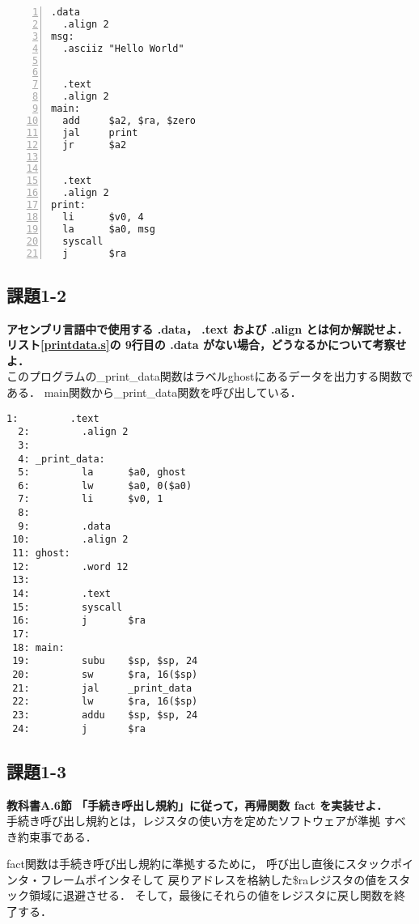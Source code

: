\documentclass[11pt]{jarticle}
\begin{document}
\begin{lstlisting}[caption=syscall命令を使う方法,label=syscall命令を使う方法,numbers=left]
  .data
  .align 2
msg:
  .asciiz "Hello World"


  .text
  .align 2
main:
  add     $a2, $ra, $zero
  jal     print
  jr      $a2

  
  .text
  .align 2
print:
  li      $v0, 4
  la      $a0, msg
  syscall
  j       $ra
\end{lstlisting}

\subsection{課題1-2}

\textbf{アセンブリ言語中で使用する .data， .text および .align とは何か解説せよ． リスト\ref{printdata.s}の 9行目の .data がない場合，どうなるかについて考察せよ．}\\

このプログラムの\_print\_data関数はラベルghostにあるデータを出力する関数である．
main関数から\_print\_data関数を呼び出している．

\begin{lstlisting}[caption=printdata.s,label=printdata.s]
  1:         .text
  2:         .align 2
  3: 
  4: _print_data:
  5:         la      $a0, ghost
  6:         lw      $a0, 0($a0)
  7:         li      $v0, 1
  8: 
  9:         .data
 10:         .align 2
 11: ghost:
 12:         .word 12
 13: 
 14:         .text
 15:         syscall
 16:         j       $ra
 17: 
 18: main:
 19:         subu    $sp, $sp, 24
 20:         sw      $ra, 16($sp)
 21:         jal     _print_data
 22:         lw      $ra, 16($sp)
 23:         addu    $sp, $sp, 24
 24:         j       $ra
\end{lstlisting}

\subsection{課題1-3}

\textbf{教科書A.6節 「手続き呼出し規約」に従って，再帰関数 fact を実装せよ．}\\

手続き呼び出し規約とは，レジスタの使い方を定めたソフトウェアが準拠
すべき約束事である．

fact関数は手続き呼び出し規約に準拠するために，
呼び出し直後にスタックポインタ・フレームポインタそして
戻りアドレスを格納した\$raレジスタの値をスタック領域に退避させる．
そして，最後にそれらの値をレジスタに戻し関数を終了する．
\end{document}
